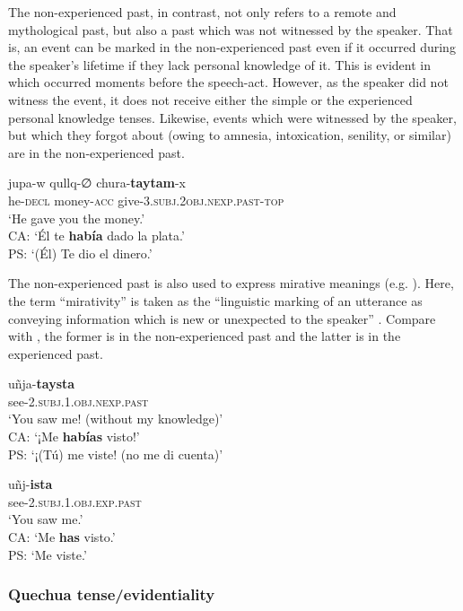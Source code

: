 \documentclass[output=paper,hidelinks]{langscibook}
\begin{document}
The non-experienced past, in contrast, not only refers to a remote and mythological past, but also a past which was not witnessed by the speaker. That is, an event can be marked in the non-experienced past even if it occurred during the speaker’s lifetime if they lack personal knowledge of it. This is evident in  which occurred moments before the speech-act. However, as the speaker did not witness the event, it does not receive either the simple or the experienced personal knowledge tenses. Likewise, events which were witnessed by the speaker, but which they forgot about (owing to amnesia, intoxication, senility, or similar) are in the non-experienced past.

\ea \label{ex:distal1}
\gll jupa-w qullq-∅ chura-\textbf{taytam}-x \\
he-\textsc{decl} money-\textsc{acc} give-\textsc{3.subj.2obj.nexp.past-top} \\ 
\glt ‘He gave you the money.’ \citep[421]{coler2014grammar} \\ 
CA: `Él te \textbf{hab\'{i}a} dado la plata.'\\
PS: `(Él) Te dio el dinero.'
\z

The non-experienced past is also used to express mirative meanings (e.g. \cite[83]{MartinezVera}). Here, the term “mirativity” is taken as the “linguistic marking of an utterance as conveying information which is new or unexpected to the speaker” \citep{delancey2001mirative}. Compare  with , the former is in the non-experienced past and the latter is in the experienced past.



\ea \label{ex:Aym-mirative}
\gll uñja-\textbf{taysta} \\
see-\textsc{2.subj.1.obj.nexp.past} \\ 
\glt ‘You saw me! (without my knowledge)’ \citep[422]{coler2014grammar}\\
CA: `¡Me \textbf{habías} visto!'\\
PS: `¡(Tú) me viste! (no me di cuenta)' 
\z

\ea \label{ex:Aym-sim}
\gll uñj-\textbf{ista} \\
see-\textsc{2.subj.1.obj.exp.past} \\ 
\glt ‘You saw me.’\\
CA: `Me \textbf{has} visto.'\\
PS: `Me viste.'
\z

\subsubsection{Quechua tense/evidentiality}
\end{document}
